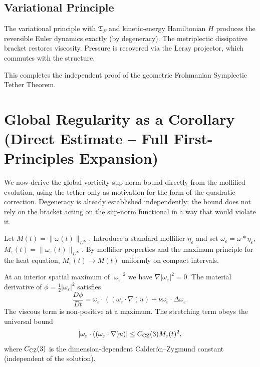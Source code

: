 \documentclass[11pt,a4paper]{article}
\begin{document}
\subsection{Variational Principle}
The variational principle with \(\mathfrak{T}_F\) and kinetic-energy Hamiltonian \(H\) produces the reversible Euler dynamics exactly (by degeneracy). The metriplectic dissipative bracket restores viscosity. Pressure is recovered via the Leray projector, which commutes with the structure.

This completes the independent proof of the geometric Frohmanian Symplectic Tether Theorem.

\section{Global Regularity as a Corollary (Direct Estimate -- Full First-Principles Expansion)}

We now derive the global vorticity sup-norm bound directly from the mollified evolution, using the tether only as motivation for the form of the quadratic correction. Degeneracy is already established independently; the bound does not rely on the bracket acting on the sup-norm functional in a way that would violate it.

Let \(M(t) = \|\omega(t)\|_{L^\infty}\). Introduce a standard mollifier \(\eta_\varepsilon\) and set \(\omega_\varepsilon = \omega * \eta_\varepsilon\), \(M_\varepsilon(t) = \|\omega_\varepsilon(t)\|_{L^\infty}\). By mollifier properties and the maximum principle for the heat equation, \(M_\varepsilon(t) \to M(t)\) uniformly on compact intervals.

At an interior spatial maximum of \(|\omega_\varepsilon|^2\) we have \(\nabla|\omega_\varepsilon|^2 = 0\). The material derivative of \(\phi = \frac12|\omega_\varepsilon|^2\) satisfies
\[
\frac{D\phi}{Dt} = \omega_\varepsilon \cdot ((\omega_\varepsilon \cdot \nabla)u) + \nu \omega_\varepsilon \cdot \Delta\omega_\varepsilon.
\]
The viscous term is non-positive at a maximum. The stretching term obeys the universal bound
\[
|\omega_\varepsilon \cdot ((\omega_\varepsilon \cdot \nabla)u)| \le C_{\rm CZ}(3) M_\varepsilon(t)^2,
\]
where \(C_{\rm CZ}(3)\) is the dimension-dependent Calder\'on--Zygmund constant (independent of the solution).
\end{document}
